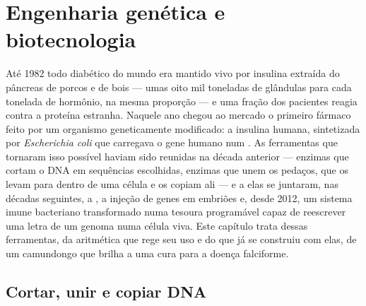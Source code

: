 \chapter{Engenharia genética e biotecnologia}\label{ch:b3:genetic-engineering}

Até 1982 todo diabético do mundo era mantido vivo por insulina
extraída do pâncreas de porcos e de bois --- umas oito mil toneladas de
glândulas para cada tonelada de hormônio, na mesma proporção --- e uma
fração dos pacientes reagia contra a proteína estranha. Naquele ano
chegou ao mercado o primeiro fármaco feito por um organismo
geneticamente modificado: a insulina humana, sintetizada por
\emph{Escherichia coli} que carregava o gene humano num . As
ferramentas que tornaram isso possível haviam sido reunidas na década
anterior --- enzimas que cortam o DNA em sequências escolhidas, enzimas
que unem os pedaços,  que os levam para dentro de uma célula
e os copiam ali --- e a elas se juntaram, nas décadas seguintes, a
, a injeção de genes em embriões e,
desde 2012, um sistema imune bacteriano transformado numa tesoura
programável capaz de reescrever uma letra de um genoma numa célula
viva. Este capítulo trata dessas ferramentas, da aritmética que rege
seu uso e do que já se construiu com elas, de um camundongo que brilha
a uma cura para a doença falciforme.

\section{Cortar, unir e copiar DNA}

